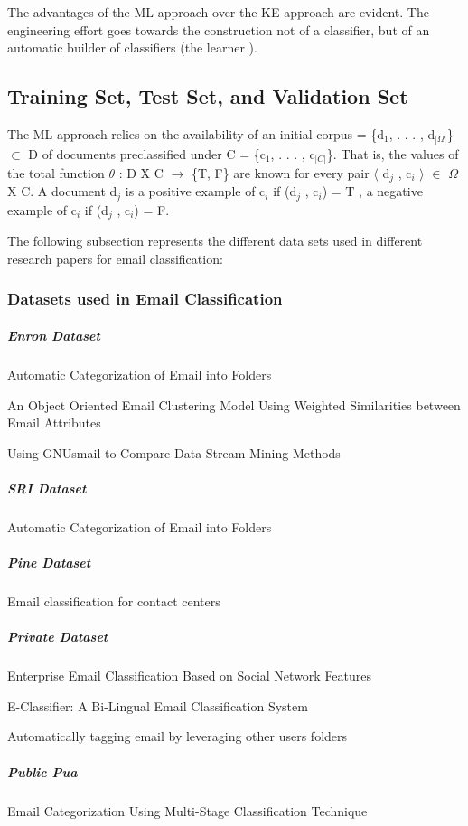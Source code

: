The advantages of the ML approach over the KE approach are evident. The engineering eﬀort goes towards the construction not of a classiﬁer, but of an automatic builder of classiﬁers (the learner ). \cite{Sebastiani2002}

\subsection{Training Set, Test Set, and Validation Set}
The ML approach relies on the availability of an initial corpus = \{d$_{1}$, . . . , d$_{|\Omega|}$\} $\subset$ D of documents preclassified under C = \{c$_{1}$, . . . , c$_{|C|}$\}. That is, the values of the total function $\theta$ : D X C $\rightarrow$ \{T, F\} are known for every pair $\langle$ d$_{j}$ , c$_{i}$ $\rangle$ $\in$   $\Omega$ X C. A document d$_{j}$ is a positive example of c$_{i}$ if (d$_{j}$ , c$_{i}$) = T , a negative example of c$_{i}$ if
(d$_{j}$ , c$_{i}$) = F.

The following subsection represents the different data sets used  in different research papers for email classification:

\subsubsection{Datasets used in Email Classification}
\subparagraph{Enron Dataset}
    \begin{my_itemize}
        \item Automatic Categorization of Email into Folders \cite{RON04}
        \item An Object Oriented Email Clustering Model Using  Weighted Similarities 
  between Email Attributes \cite{NARESH10}
        \item Using GNUsmail to Compare Data Stream Mining Methods \cite{JOSE11}
    \end{my_itemize}
\subparagraph{SRI Dataset}
    \begin{my_itemize}
        \item Automatic Categorization of Email into Folders \cite{RON04}
    \end{my_itemize}
\subparagraph{Pine Dataset}
    \begin{my_itemize}
        \item Email classification for contact centers \cite{ANI03}
    \end{my_itemize}
\subparagraph{Private Dataset}
    \begin{my_itemize}
        \item Enterprise Email Classification Based on Social Network Features \cite{MIN11}
        \item E-Classifier: A Bi-Lingual Email Classification System \cite{NOUF08} 
        \item Automatically tagging email by leveraging other users folders \cite{YEHUDA11}
    \end{my_itemize}
\subparagraph{Public Pua}
    \begin{my_itemize}
        \item Email Categorization Using Multi-Stage Classification Technique \cite{MD07}
    \end{my_itemize}

